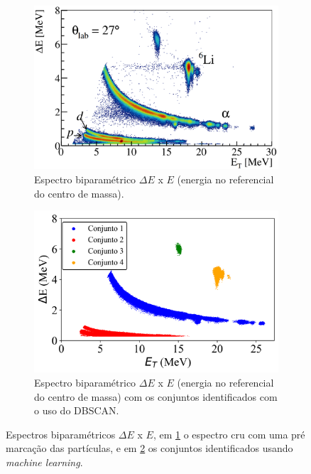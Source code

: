 \documentclass[a4paper,12pt,oneside]{book}
\begin{document}
\begin{appendices}
\begin{figure}[H]
\centering
    \begin{subfigure}[t]{0.48\textwidth}
        \centering
        \includegraphics[scale=0.21]{figs/espectro_1.png}
        \caption{Espectro biparamétrico $\Delta E$ x $E$ (energia no referencial do centro de massa).}
        \label{subfig:espectro_1}
    \end{subfigure}%
    \hfill
    \begin{subfigure}[t]{0.48\textwidth}
        \centering
        \includegraphics[scale=0.52]{figs/espectro_2.png}
        \caption{Espectro biparamétrico $\Delta E$ x $E$ (energia no referencial do centro de massa) com os conjuntos identificados com o uso do DBSCAN.}
        \label{subfig:espectro_2}
    \end{subfigure}
\caption{Espectros biparamétricos $\Delta E$ x $E$, em \ref{subfig:espectro_1} o espectro cru com uma pré marcação das partículas, e em \ref{subfig:espectro_2} os conjuntos identificados usando \textit{machine learning}.}
\label{fig:espectros_ex_ml}
\end{figure}


\end{appendices}
\end{document}
